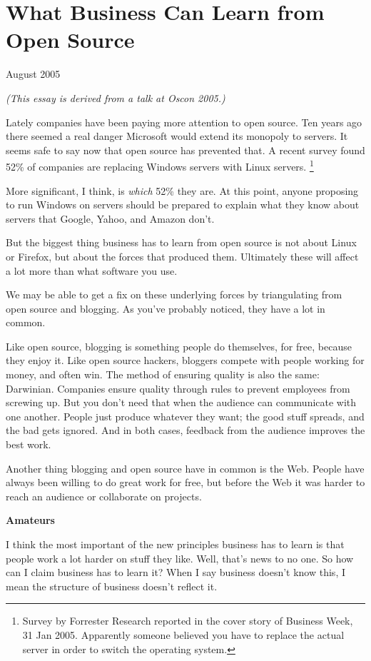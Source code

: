 \chapter{What Business Can Learn from Open Source}

August 2005

\emph{(This essay is derived from a talk at Oscon 2005.)}

Lately companies have been paying more attention to open source. Ten
years ago there seemed a real danger Microsoft would extend its monopoly
to servers. It seems safe to say now that open source has prevented
that. A recent survey found 52\% of companies are replacing Windows
servers with Linux servers. \footnote{Survey by Forrester Research reported in the cover story of
Business Week, 31 Jan 2005. Apparently someone believed you have to
replace the actual server in order to switch the operating system.}

More significant, I think, is \emph{which} 52\% they are. At this point,
anyone proposing to run Windows on servers should be prepared to explain
what they know about servers that Google, Yahoo, and Amazon don't.

But the biggest thing business has to learn from open source is not
about Linux or Firefox, but about the forces that produced them.
Ultimately these will affect a lot more than what software you use.

We may be able to get a fix on these underlying forces by triangulating
from open source and blogging. As you've probably noticed, they have a
lot in common.

Like open source, blogging is something people do themselves, for free,
because they enjoy it. Like open source hackers, bloggers compete with
people working for money, and often win. The method of ensuring quality
is also the same: Darwinian. Companies ensure quality through rules to
prevent employees from screwing up. But you don't need that when the
audience can communicate with one another. People just produce whatever
they want; the good stuff spreads, and the bad gets ignored. And in both
cases, feedback from the audience improves the best work.

Another thing blogging and open source have in common is the Web. People
have always been willing to do great work for free, but before the Web
it was harder to reach an audience or collaborate on projects.

\textbf{Amateurs}

I think the most important of the new principles business has to learn
is that people work a lot harder on stuff they like. Well, that's news
to no one. So how can I claim business has to learn it? When I say
business doesn't know this, I mean the structure of business doesn't
reflect it.

